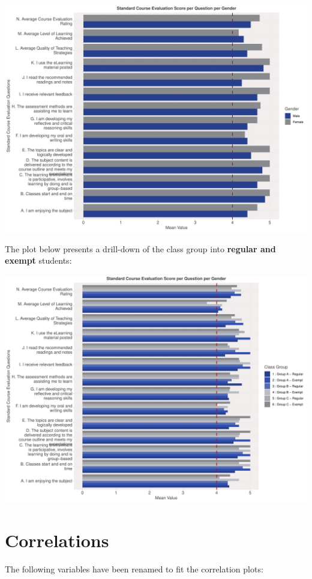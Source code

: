 \documentclass[
]{article}
\begin{document}
\includegraphics{AnalysisOfCourseEvaluation-Notebook_files/figure-latex/VisualizationsForCourseEvaluationResultsperGender-1.pdf}

The plot below presents a drill-down of the class group into
\textbf{regular and exempt} students:

\includegraphics{AnalysisOfCourseEvaluation-Notebook_files/figure-latex/VisualizationsForCourseEvaluationResultsperGroup-1.pdf}

\section{Correlations}\label{correlations}

The following variables have been renamed to fit the correlation plots:
\end{document}

